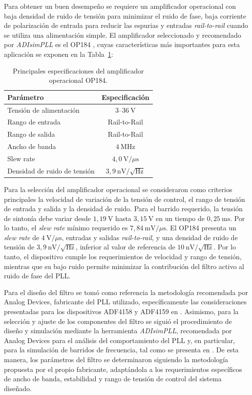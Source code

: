 Para obtener un buen desempeño se requiere un amplificador operacional con baja densidad de ruido de tensión para minimizar el ruido de fase, baja corriente de polarización de entrada para reducir las espurias y entradas \textit{rail-to-rail} cuando se utiliza una alimentación simple. El amplificador seleccionado y recomendado por \textit{ADIsimPLL} es el OP184 \cite{op184}, cuyas características más importantes para esta aplicación se exponen en la Tabla~\ref{tab:op184_specs}:

\begin{table}[H]
\centering
\begin{tabular}{lc}
\hline
\textbf{Parámetro} & \textbf{Especificación} \\
\hline
Tensión de alimentación & $3$--$36~\mathrm{V}$ \\
Rango de entrada & Rail-to-Rail \\
Rango de salida & Rail-to-Rail \\
Ancho de banda & $4~\mathrm{MHz}$ \\
Slew rate & $4{,}0~\mathrm{V}/\mu\mathrm{s}$ \\
Densidad de ruido de tensión & $3{,}9~\mathrm{nV}/\sqrt{\mathrm{Hz}}$ \\
\hline
\end{tabular}
\caption{Principales especificaciones del amplificador operacional OP184.}
\label{tab:op184_specs}
\end{table}

Para la selección del amplificador operacional se consideraron como criterios principales la velocidad de variación de la tensión de control, el rango de tensión de entrada y salida y la densidad de ruido. Para el barrido requerido, la tensión de sintonía debe variar desde $1{,}19~\mathrm{V}$ hasta $3{,}15~\mathrm{V}$ en un tiempo de $0{,}25~\mathrm{ms}$. Por lo tanto, el \textit{slew rate} mínimo requerido es $7{,}84~\mathrm{mV}/\mu\mathrm{s}$. El OP184 presenta un \textit{slew rate} de $4~\mathrm{V}/\mu\mathrm{s}$, entradas y salidas \textit{rail-to-rail}, y una densidad de ruido de tensión de $3{,}9~\mathrm{nV}/\sqrt{\mathrm{Hz}}$, inferior al valor de referencia de $10~\mathrm{nV}/\sqrt{\mathrm{Hz}}$. Por lo tanto, el dispositivo cumple los requerimientos de velocidad y rango de tensión, mientras que su bajo ruido permite minimizar la contribución del filtro activo al ruido de fase del PLL.

Para el diseño del filtro se tomó como referencia la metodología recomendada por Analog Devices, fabricante del PLL utilizado, específicamente las consideraciones presentadas para los dispositivos ADF4158 y ADF4159 en \cite{AnalogDevices2015ADF4158}. Asimismo, para la selección y ajuste de los componentes del filtro se siguió el procedimiento de diseño y simulación mediante la herramienta \textit{ADIsimPLL}, recomendada por Analog Devices para el análisis del comportamiento del PLL y, en particular, para la simulación de barridos de frecuencia, tal como se presenta en \cite{AnalogDevices2012ADIsimPLL}. De esta manera, los parámetros del filtro se determinaron siguiendo la metodología propuesta por el propio fabricante, adaptándola a los requerimientos específicos de ancho de banda, estabilidad y rango de tensión de control del sistema diseñado.

